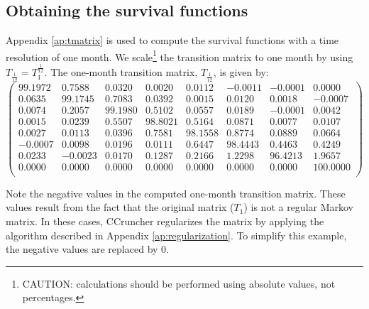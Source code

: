 \documentclass[a4paper,12pt,final]{article}
\begin{document}
\subsection{Obtaining the survival functions}

Appendix \ref{ap:tmatrix} is used to compute the survival functions 
with a time resolution of one month. We scale\footnote{CAUTION: 
calculations should be performed using absolute values, not percentages.}
the transition matrix to one month by using $T_{\frac{1}{12}} = T_{1}^{\frac{1}{12}}$.  
The one-month transition matrix, $T_{\frac{1}{12}}$, is given by:
{\small
\begin{displaymath}
\left( 
\begin{array}{cccccccc}
    99.1972  &   0.7588  &   0.0320  &   0.0020  &   0.0112  &  -0.0011  &  -0.0001  &   0.0000  \\
     0.0635  &  99.1745  &   0.7083  &   0.0392  &   0.0015  &   0.0120  &   0.0018  &  -0.0007  \\
     0.0074  &   0.2057  &  99.1980  &   0.5102  &   0.0557  &   0.0189  &  -0.0001  &   0.0042  \\
     0.0015  &   0.0239  &   0.5507  &  98.8021  &   0.5164  &   0.0871  &   0.0077  &   0.0107  \\
     0.0027  &   0.0113  &   0.0396  &   0.7581  &  98.1558  &   0.8774  &   0.0889  &   0.0664  \\
    -0.0007  &   0.0098  &   0.0196  &   0.0111  &   0.6447  &  98.4443  &   0.4463  &   0.4249  \\
     0.0233  &  -0.0023  &   0.0170  &   0.1287  &   0.2166  &   1.2298  &  96.4213  &   1.9657  \\
     0.0000  &   0.0000  &   0.0000  &   0.0000  &   0.0000  &   0.0000  &   0.0000  & 100.0000  \\
\end{array}
\right)
\end{displaymath}
}

Note the negative values in the computed one-month transition matrix. 
These values result from the fact that the original matrix ($T_1$) is not a regular Markov matrix. 
In these cases, CCruncher regularizes the matrix by applying the algorithm described in Appendix 
\ref{ap:regularization}. To simplify this example, the negative values are replaced by $0$.
\newline
\end{document}
